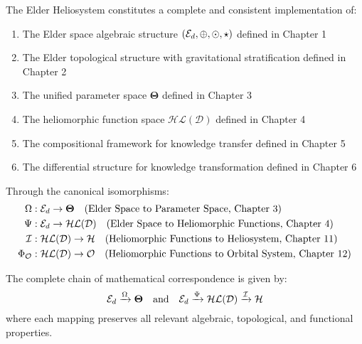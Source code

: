 \begin{theorem}
\label{thm:unified_framework}
The Elder Heliosystem constitutes a complete and consistent implementation of:
\begin{enumerate}
    \item The Elder space algebraic structure $(\mathcal{E}_{d}, \oplus, \odot, \star)$ defined in Chapter 1
    \item The Elder topological structure with gravitational stratification defined in Chapter 2
    \item The unified parameter space $\boldsymbol{\Theta}$ defined in Chapter 3
    \item The heliomorphic function space $\mathcal{HL}(\mathcal{D})$ defined in Chapter 4
    \item The compositional framework for knowledge transfer defined in Chapter 5
    \item The differential structure for knowledge transformation defined in Chapter 6
\end{enumerate}

Through the canonical isomorphisms:
\begin{align}
\Omega&: \mathcal{E}_{d} \rightarrow \boldsymbol{\Theta} \quad \text{(Elder Space to Parameter Space, Chapter 3)}\\
\Psi&: \mathcal{E}_{d} \rightarrow \mathcal{HL}(\mathcal{D}) \quad \text{(Elder Space to Heliomorphic Functions, Chapter 4)}\\
\mathcal{I}&: \mathcal{HL}(\mathcal{D}) \rightarrow \mathcal{H} \quad \text{(Heliomorphic Functions to Heliosystem, Chapter 11)}\\
\Phi_{\mathcal{O}}&: \mathcal{HL}(\mathcal{D}) \rightarrow \mathcal{O} \quad \text{(Heliomorphic Functions to Orbital System, Chapter 12)}
\end{align}

The complete chain of mathematical correspondence is given by:
\begin{equation}
\mathcal{E}_{d} \xrightarrow{\Omega} \boldsymbol{\Theta} \quad \text{and} \quad \mathcal{E}_{d} \xrightarrow{\Psi} \mathcal{HL}(\mathcal{D}) \xrightarrow{\mathcal{I}} \mathcal{H}
\end{equation}
where each mapping preserves all relevant algebraic, topological, and functional properties.
\end{theorem}

